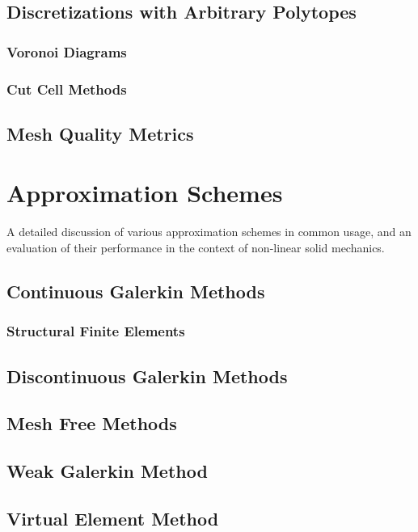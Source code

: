 \subsection{Discretizations with Arbitrary Polytopes}
\subsubsection{Voronoi Diagrams}
\subsubsection{Cut Cell Methods}

\subsection{Mesh Quality Metrics}

\section{Approximation Schemes}
%
A detailed discussion of various approximation schemes in common usage, and an evaluation of their performance in the context of non-linear solid mechanics.
\subsection{Continuous Galerkin Methods}
\subsubsection{Structural Finite Elements}

\subsection{Discontinuous Galerkin Methods}

\subsection{Mesh Free Methods}

\subsection{Weak Galerkin Method}

\subsection{Virtual Element Method}
